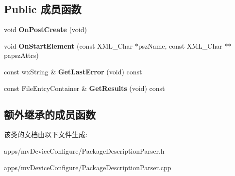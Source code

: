\subsection*{Public 成员函数}
\begin{DoxyCompactItemize}
\item 
\hypertarget{class_package_description_file_parser_a53d6c806e7752228fd4e0d853e4252c6}{void {\bfseries On\+Post\+Create} (void)}\label{class_package_description_file_parser_a53d6c806e7752228fd4e0d853e4252c6}

\item 
\hypertarget{class_package_description_file_parser_acb66f52171efc89c66f154923c097448}{void {\bfseries On\+Start\+Element} (const X\+M\+L\+\_\+\+Char $\ast$psz\+Name, const X\+M\+L\+\_\+\+Char $\ast$$\ast$papsz\+Attrs)}\label{class_package_description_file_parser_acb66f52171efc89c66f154923c097448}

\item 
\hypertarget{class_package_description_file_parser_a64a44068f116275c717515a0f379dd4e}{const wx\+String \& {\bfseries Get\+Last\+Error} (void) const }\label{class_package_description_file_parser_a64a44068f116275c717515a0f379dd4e}

\item 
\hypertarget{class_package_description_file_parser_a75eb00515f9161c2554e3bc5e6883a0f}{const File\+Entry\+Container \& {\bfseries Get\+Results} (void) const }\label{class_package_description_file_parser_a75eb00515f9161c2554e3bc5e6883a0f}

\end{DoxyCompactItemize}
\subsection*{额外继承的成员函数}


该类的文档由以下文件生成\+:\begin{DoxyCompactItemize}
\item 
apps/mv\+Device\+Configure/Package\+Description\+Parser.\+h\item 
apps/mv\+Device\+Configure/Package\+Description\+Parser.\+cpp\end{DoxyCompactItemize}
